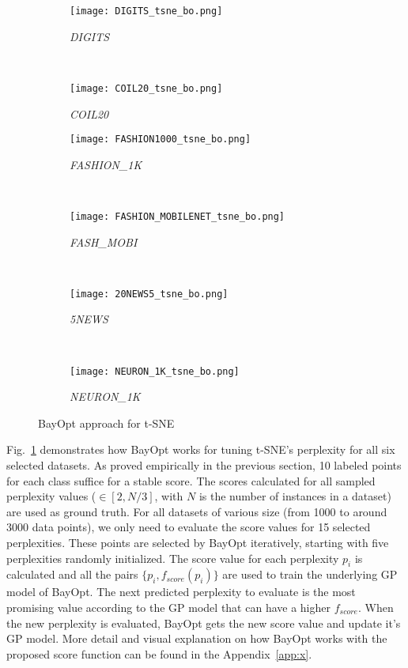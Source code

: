 \begin{figure}%
    \begin{subfigure}[b]{.46\linewidth}
        \centering
        \texttt{[image: DIGITS\_tsne\_bo.png]}
        \caption{\emph{DIGITS}}
    \end{subfigure}
    ~
    \begin{subfigure}[b]{.46\linewidth}
        \centering
        \texttt{[image: COIL20\_tsne\_bo.png]}
        \caption{\emph{COIL20}}
    \end{subfigure}
    \vfill
    \begin{subfigure}[b]{.46\linewidth}
        \centering
        \texttt{[image: FASHION1000\_tsne\_bo.png]}
        \caption{\emph{FASHION\_1K}}
    \end{subfigure}
    ~
    \begin{subfigure}[b]{.46\linewidth}
        \centering
        \texttt{[image: FASHION\_MOBILENET\_tsne\_bo.png]}
        \caption{\emph{FASH\_MOBI}}
    \end{subfigure}
    ~
    \vfill
    \begin{subfigure}[b]{.46\linewidth}
        \centering
        \texttt{[image: 20NEWS5\_tsne\_bo.png]}
        \caption{\emph{5NEWS}}
    \end{subfigure}
    ~
    \begin{subfigure}[b]{.46\linewidth}
        \centering
        \texttt{[image: NEURON\_1K\_tsne\_bo.png]}
        \caption{\emph{NEURON\_1K}}
    \end{subfigure}
    \caption{BayOpt approach for  t-SNE}
    \label{fig:tsne:bo:all}
\end{figure}

Fig.~\ref{fig:tsne:bo:all} demonstrates how BayOpt works for tuning t-SNE's perplexity for all six selected datasets.
As proved empirically in the previous section, 10 labeled points for each class suffice for a stable score.
The scores calculated for all sampled perplexity values ($\in [2, N/3]$, with $N$ is the number of instances in a dataset) are used as ground truth.
For all datasets of various size (from 1000 to around 3000 data points), we only need to evaluate the score values for 15 selected perplexities.
These points are selected by BayOpt iteratively, starting with five perplexities randomly initialized.
The score value for each perplexity $p_i$ is calculated and all the pairs $\{p_i, f_{score}(p_i)\}$ are used to train the underlying GP model of BayOpt.
The next predicted perplexity to evaluate is the most promising value according to the GP model that can have a higher $f_{score}$.
When the new perplexity is evaluated, BayOpt gets the new score value and update it's GP model.
More detail and visual explanation on how BayOpt works with the proposed score function can be found in the Appendix~\ref{app:x}.

